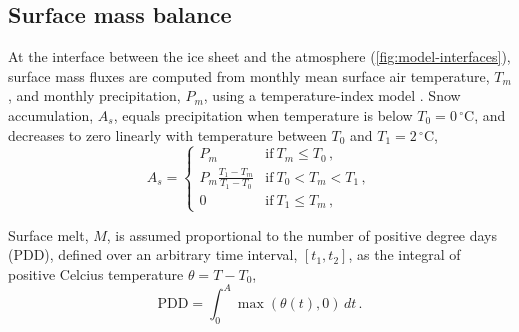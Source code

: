 \documentclass[a4paper]{kappa}
\newcommand{\unit}[1]{\ensuremath{\mathrm{#1}}}
\newcommand{\degree}[0]{\ensuremath{^{\circ}}}
\newcommand{\degC}[0]{\unit{{\degree}C}}
\begin{document}
\subsection{Surface mass balance}

At the interface between the ice sheet and the atmosphere
(\cref{fig:model-interfaces}),
surface mass fluxes are computed from monthly mean surface air temperature,
$T_m$, and monthly precipitation, $P_m$, using a temperature-index model
\citep[\cref{fig:model-pdd}; cf.][]{Hock.2003}. Snow accumulation, $A_s$,
equals precipitation
when temperature is below ${T_0=0\,\degC}$, and decreases to zero
linearly with temperature between $T_0$ and ${T_1=2\,\degC}$,
\begin{equation}
    A_s =
    \begin{cases}
        P_m     & \text{if}\ T_m \le T_0 \,, \\
        P_m \frac{T_1-T_m}{T_1-T_0}
                & \text{if}\ T_0 < T_m < T_1 \,, \\
        0       & \text{if}\ T_1 \le T_m \,,
    \end{cases}
\end{equation}

Surface melt, $M$, is assumed proportional to the number of positive degree
days (PDD), defined over an arbitrary time interval, $[t_1, t_2]$, as the
integral of positive Celcius temperature $\theta = T-T_0$,
\begin{equation}
    \mathrm{PDD} = \int_{0}^{A}\max(\theta(t),0)\,dt \,.
\end{equation}
\end{document}
